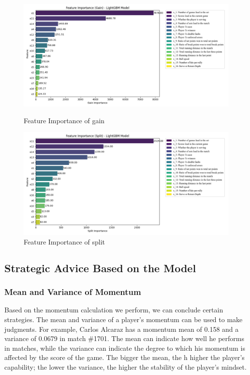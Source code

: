 \documentclass{mcmthesis}
\begin{document}
\begin{figure}[ht]
    \centering
    \begin{minipage}{0.5\textwidth}
        \centering
        \includegraphics[width=\textwidth]{figures/Feature_importance_gain(Match).png} %
        \caption{Feature Importance of gain}
        \label{fig:gain}
    \end{minipage}\hfill
    \begin{minipage}{0.5\textwidth}
        \centering
        \includegraphics[width=\textwidth]{figures/Feature_importance_split(Match).png} %
        \caption{Feature Importance of split}
        \label{fig:split}
    \end{minipage}
\end{figure}

\subsection{Strategic Advice Based on the Model}
\subsubsection{Mean and Variance of Momentum}
Based on the momentum calculation we perform, we can conclude certain strategies. The mean and variance of a player's momentum can be used to make judgments. For example, Carlos Alcaraz has a momentum mean of 0.158 and a variance of 0.0679 in match \#1701. The mean can indicate how well he performs in matches, while the variance can indicate the degree to which his momentum is affected by the score of the game. The bigger the mean, the h higher the player's capability; the lower the variance, the higher the stability of the player's mindset.
\end{document}

